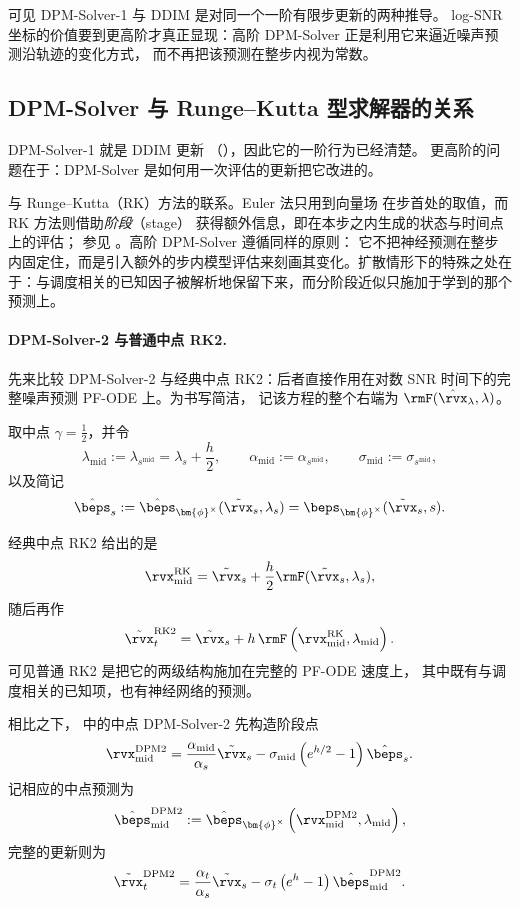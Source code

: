 可见 DPM-Solver-1 与 DDIM 是对同一个一阶有限步更新的两种推导。
log-SNR 坐标的价值要到更高阶才真正显现：高阶 DPM-Solver
正是利用它来逼近噪声预测沿轨迹的变化方式，
而不再把该预测在整步内视为常数。


\subsection{DPM-Solver 与 Runge--Kutta 型求解器的关系}
\label{subsec:dpm-rk}

DPM-Solver-1 就是 DDIM 更新
（），因此它的一阶行为已经清楚。
更高阶的问题在于：DPM-Solver 是如何用一次评估的更新把它改进的。

与 Runge--Kutta（RK）方法的联系。Euler 法只用到向量场
在步首处的取值，而 RK 方法则借助\emph{阶段}（stage）
获得额外信息，即在本步之内生成的状态与时间点上的评估；
参见 。高阶 DPM-Solver 遵循同样的原则：
它不把神经预测在整步内固定住，而是引入额外的步内模型评估来刻画其变化。扩散情形下的特殊之处在于：与调度相关的已知因子被解析地保留下来，而分阶段近似只施加于学到的那个预测上。

\paragraph{DPM-Solver-2 与普通中点 RK2.}
先来比较 DPM-Solver-2 与经典中点 RK2：后者直接作用在对数 SNR 时间下的完整噪声预测 PF-ODE
 上。为书写简洁，
记该方程的整个右端为 $\rmF(\hat\rvx_\lambda,\lambda)$。

取中点 $\gamma=\tfrac12$，并令
\[
\lambda_{\mathrm{mid}}
:=
\lambda_{s^{\mathrm{mid}}}
=
\lambda_s+\frac{h}{2},
\qquad
\alpha_{\mathrm{mid}}
:=
\alpha_{s^{\mathrm{mid}}},
\qquad
\sigma_{\mathrm{mid}}
:=
\sigma_{s^{\mathrm{mid}}},
\]
以及简记
\[
\hat\beps_s
:=
\hat\beps_{\bm{\phi}^\times}(\tilde\rvx_s,\lambda_s)
=
\beps_{\bm{\phi}^\times}(\tilde\rvx_s,s).
\]

经典中点 RK2 给出的是
\[
\rvx_{\mathrm{mid}}^{\mathrm{RK}}
=
\tilde\rvx_s
+
\frac{h}{2}
\rmF(\tilde\rvx_s,\lambda_s),
\]
随后再作
\[
\tilde\rvx_t^{\mathrm{RK2}}
=
\tilde\rvx_s
+
h\,
\rmF
\left(
\rvx_{\mathrm{mid}}^{\mathrm{RK}},
\lambda_{\mathrm{mid}}
\right).
\]
可见普通 RK2 是把它的两级结构施加在完整的 PF-ODE 速度上，
其中既有与调度相关的已知项，也有神经网络的预测。

相比之下， 中的中点 DPM-Solver-2
先构造阶段点
\[
\rvx_{\mathrm{mid}}^{\mathrm{DPM2}}
=
\frac{\alpha_{\mathrm{mid}}}{\alpha_s}\tilde\rvx_s
-
\sigma_{\mathrm{mid}}
\left(
e^{h/2}-1
\right)
\hat\beps_s.
\]
记相应的中点预测为
\[
\hat\beps_{\mathrm{mid}}^{\mathrm{DPM2}}
:=
\hat\beps_{\bm{\phi}^\times}
\left(
\rvx_{\mathrm{mid}}^{\mathrm{DPM2}},
\lambda_{\mathrm{mid}}
\right),
\]
完整的更新则为
\[
\tilde\rvx_t^{\mathrm{DPM2}}
=
\frac{\alpha_t}{\alpha_s}\tilde\rvx_s
-
\sigma_t
\left(
e^h-1
\right)
\hat\beps_{\mathrm{mid}}^{\mathrm{DPM2}}.
\]

